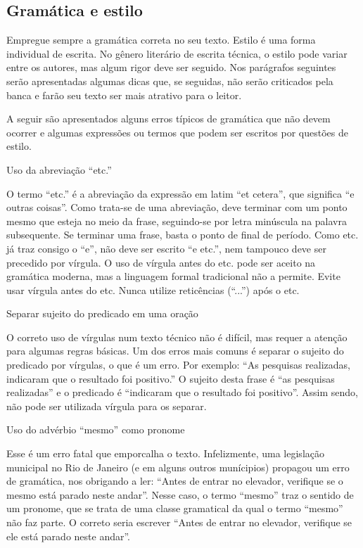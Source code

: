 \subsection{Gramática e estilo}
Empregue sempre a gramática correta no seu texto. Estilo é uma forma individual de escrita. No gênero literário de escrita técnica, o estilo pode variar entre os autores, mas algum rigor deve ser seguido. Nos parágrafos seguintes serão apresentadas algumas dicas que, se seguidas, não serão criticados pela banca e farão seu texto ser mais atrativo para o leitor.

A seguir são apresentados alguns erros típicos de gramática que não devem ocorrer e algumas expressões ou termos que podem ser escritos por questões de estilo.

\begin{enumerate}[label=\alph*)]

{\bfseries \item  Uso da abreviação “etc.”}

O termo “etc.” é a abreviação da expressão em latim “et cetera”, que significa “e outras coisas”. Como trata-se de uma abreviação, deve terminar com um ponto mesmo que esteja no meio da frase, seguindo-se por letra minúscula na palavra subsequente. Se terminar uma frase, basta o ponto de final de período. Como etc. já traz consigo o “e”, não deve ser escrito “e etc.”, nem tampouco deve ser precedido por vírgula. O uso de vírgula antes do etc. pode ser aceito na gramática moderna, mas a linguagem formal tradicional não a permite. Evite usar vírgula antes do etc. Nunca utilize reticências (“...”) após o etc.

{\bfseries \item  Separar sujeito do predicado em uma oração}

O correto uso de vírgulas num texto técnico não é difícil, mas requer a atenção para algumas regras básicas. Um dos erros mais comuns é separar o sujeito do predicado por vírgulas, o que é um erro. Por exemplo:
“As pesquisas realizadas, indicaram que o resultado foi positivo.”
O sujeito desta frase é “as pesquisas realizadas” e o predicado é “indicaram que o resultado foi positivo”. Assim sendo, não pode ser utilizada vírgula para os separar.

{\bfseries \item  Uso do advérbio “mesmo” como pronome}

Esse é um erro fatal que emporcalha o texto. Infelizmente, uma legislação municipal no Rio de Janeiro (e em alguns outros munícipios) propagou um erro de gramática, nos obrigando a ler: “Antes de entrar no elevador, verifique se o mesmo está parado neste andar”. Nesse caso, o termo “mesmo” traz o sentido de um pronome, que se trata de uma classe gramatical da qual o termo “mesmo” não faz parte. O correto seria escrever “Antes de entrar no elevador, verifique se ele está parado neste andar”.


\end{enumerate}
